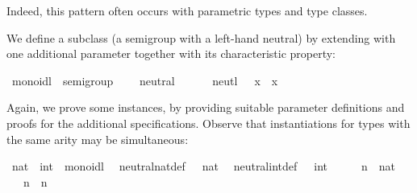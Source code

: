 \begin{isabellebody}
\begin{isamarkuptext}
  Indeed, this pattern often occurs with parametric types
  and type classes.%
\end{isamarkuptext}%
\isamarkuptrue%
%
\isamarkuptrue%
%
\begin{isamarkuptext}%
We define a subclass  (a semigroup with a left-hand neutral)
  by extending 
  with one additional parameter  together
  with its characteristic property:%
\end{isamarkuptext}%
\isamarkuptrue%
%
\isadelimquote
%
\endisadelimquote
%
\isatagquote
{}\isamarkupfalse%
\ monoidl\ {\isacharequal}\ semigroup\ {\isacharplus}\isanewline
\ \ \ neutral\ {\isacharcolon}{\isacharcolon}\ {\isachardoublequoteopen}{\isasymalpha}{\isachardoublequoteclose}\ {\isacharparenleft}{\isachardoublequoteopen}{\isasymone}{\isachardoublequoteclose}{\isacharparenright}\isanewline
\ \ \ neutl{\isacharcolon}\ {\isachardoublequoteopen}{\isasymone}\ {\isasymotimes}\ x\ {\isacharequal}\ x{\isachardoublequoteclose}%
\endisatagquote
{\isafoldquote}%
%
\isadelimquote
%
\endisadelimquote
%
\begin{isamarkuptext}%
\noindent Again, we prove some instances, by
  providing suitable parameter definitions and proofs for the
  additional specifications.  Observe that instantiations
  for types with the same arity may be simultaneous:%
\end{isamarkuptext}%
\isamarkuptrue%
%
\isadelimquote
%
\endisadelimquote
%
\isatagquote
{}\isamarkupfalse%
\ nat\ \ int\ {\isacharcolon}{\isacharcolon}\ monoidl\isanewline
{}\isanewline
\isanewline
{}\isamarkupfalse%
\isanewline
\ \ neutral{\isacharunderscore}nat{\isacharunderscore}def{\isacharcolon}\ {\isachardoublequoteopen}{\isasymone}\ {\isacharequal}\ {\isacharparenleft}{}{\isasymColon}nat{\isacharparenright}{\isachardoublequoteclose}\isanewline
\isanewline
{}\isamarkupfalse%
\isanewline
\ \ neutral{\isacharunderscore}int{\isacharunderscore}def{\isacharcolon}\ {\isachardoublequoteopen}{\isasymone}\ {\isacharequal}\ {\isacharparenleft}{}{\isasymColon}int{\isacharparenright}{\isachardoublequoteclose}\isanewline
\isanewline
{}\isamarkupfalse%
\ \isamarkupfalse%
\isanewline
\ \ \isamarkupfalse%
\ n\ {\isacharcolon}{\isacharcolon}\ nat\isanewline
\ \ \isamarkupfalse%
\ {\isachardoublequoteopen}{\isasymone}\ {\isasymotimes}\ n\ {\isacharequal}\ n{\isachardoublequoteclose}\isanewline

\end{isabellebody}
